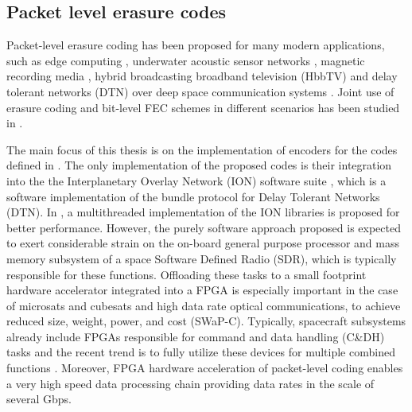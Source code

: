 \subsection{Packet level erasure codes}
Packet-level erasure coding has been proposed for many modern applications, such as edge computing \cite{Liang2020}, underwater acoustic sensor networks \cite{Geethu2015}, magnetic recording media \cite{Han2005}, hybrid broadcasting broadband television (HbbTV) \cite{Mattoussi2019} and delay tolerant networks (DTN) over deep space communication systems \cite{Alessi2020}. Joint use of erasure coding and bit-level FEC schemes in different scenarios has been studied in \cite{Courtade2011, Ostovari2015, Berger2008}.\par
The main focus of this thesis is on the implementation of encoders for the codes defined in \cite{CCSDS131.5}. The only implementation of the proposed codes is their integration into the the Interplanetary Overlay Network (ION) software suite \cite{ion}, which is a software implementation of the bundle protocol for Delay Tolerant Networks (DTN). In \cite{Alessi2020}, a multithreaded implementation of the ION libraries is proposed for better performance. However, the purely software approach proposed is expected to exert considerable strain on the on-board general purpose processor and mass memory subsystem of a space Software Defined Radio (SDR), which is typically responsible for these functions. Offloading these tasks to a small footprint hardware accelerator integrated into a FPGA is especially important in the case of microsats and cubesats and high data rate optical communications, to achieve reduced size, weight, power, and cost (SWaP-C). Typically, spacecraft subsystems already include FPGAs responsible for command and data handling (C\&DH) tasks and the recent trend is to fully utilize these devices for multiple combined functions \cite{Davarian2020}. Moreover, FPGA hardware acceleration of packet-level coding enables a very high speed data processing chain providing data rates in the scale of several Gbps.\par

